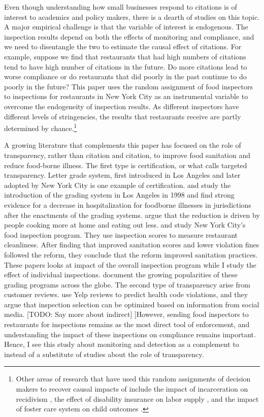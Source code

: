 \documentclass[10pt]{article} %
\begin{document}
Even though understanding how small businesses respond to citations is of interest to academics and policy makers, there is a dearth of studies on this topic. A major empirical challenge is that the variable of interest is endogenous. The inspection results depend on both the effects of monitoring and compliance, and we need to disentangle the two to estimate the causal effect of citations. For example, suppose we find that restaurants that had high numbers of citations tend to have high number of citations in the future. Do more citations lead to worse compliance or do restaurants that did poorly in the past continue to do poorly in the future? This paper uses the random assignment of food inspectors to inspections for restaurants in New York City as an instrumental variable to overcome the endogeneity of inspection results. As different inspectors have different levels of stringencies, the results that restaurants receive are partly determined by chance.\footnote{Other areas of research that have used this random assignments of decision makers to recover causal impacts of include the impact of incarceration on recidivism \citep{bhuller_16}, the effect of disability insurance on labor supply \citep{Maestas_13}, and the impact of foster care system on child outcomes \citep{Doyle_07}.}

A growing literature that complements this paper has focused on the role of transparency, rather than citation and citation, to improve food sanitation and reduce food-borne illness. The first type is certification, or what \cite{Ho_2012} calls targeted transparency. Letter grade system, first introduced in Los Angeles and later adopted by New York City is one example of certification. \cite{jie_leslie_05} and \cite{Simon_05} study the introduction of the grading system in Los Angeles in 1998 and find strong evidence for a decrease in hospitalization for foodborne illnesses in jurisdictions after the enactments of the grading systems. \cite{jie_leslie_05} argue that the reduction is driven by people cooking more at home and eating out less. \cite{Wong_at_el_2015} and \cite{Meltzer_2015} study New York City's food inspection program. They use inspection scores to measure restaurant cleanliness. After finding that improved sanitation scores and lower violation fines followed the reform, they conclude that the reform improved sanitation practices. These papers looks at impact of the overall inspection program while I study the effect of individual inspections. \cite{Filion_Powell_09} document the growing popularities of these grading programs across the globe. The second type of transparency arise from customer reviews. \cite{Luca_13} use Yelp reviews to predict health code violations, and they argue that inspection selection can be optimized based on information from social media. [TODO: Say more about indirect] ]However, sending food inspectors to restaurants for inspections remains as the most direct tool of enforcement, and understanding the impact of these inspections on compliance remains important. Hence, I see this study about monitoring and detection as a complement to instead of a substitute of studies about the role of transparency. 
\end{document}
